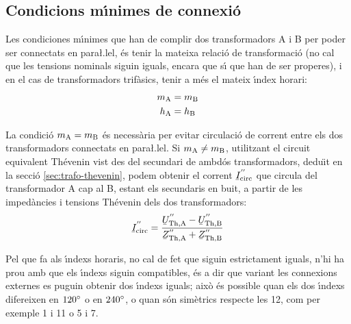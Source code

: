 \subsection{Condicions m\'{\i}nimes de connexi\'{o}}

Les condiciones m\'{\i}nimes que han de complir dos transformadors A i B per poder ser connectats en para{\l.l}el, \'{e}s tenir la mateixa relaci\'{o} de transformaci\'{o} (no cal que les tensions nominals siguin iguals, encara que s\'{\i} que han de ser properes), i en el cas de transformadors trif\`{a}sics, tenir a m\'{e}s el mateix \'{\i}ndex horari:
\begin{align}
    m_\mathrm{A} &= m_\mathrm{B}\\
    h_\mathrm{A} &= h_\mathrm{B}
\end{align}

La condici\'{o} $m_\mathrm{A} = m_\mathrm{B}$ \'{e}s necess\`{a}ria per evitar circulaci\'{o} de corrent entre els dos transformadors connectats en para{\l.l}el. Si $m_\mathrm{A} \neq m_\mathrm{B}$, utilitzant el circuit equivalent  Th\'{e}venin vist des del secundari de ambd\'{o}s transformadors, dedu\"{\i}t en la secci\'{o} \vref{sec:trafo-thevenin}, podem obtenir el corrent $\cmplx{I}\ped{circ}^{''}$ que circula del transformador A cap al B, estant els secundaris en buit, a partir de les imped\`{a}ncies i tensions Th\'{e}venin dels dos transformadors:
\begin{equation}
    \cmplx{I}\ped{circ}^{''} = \frac{\cmplx{U}\ped{Th,A}^{''}-\cmplx{U}\ped{Th,B}^{''}}{\cmplx{Z}\ped{Th,A}^{''}+\cmplx{Z}\ped{Th,B}^{''}}
\end{equation}

Pel que fa als \'{\i}ndexs horaris, no cal de fet que siguin estrictament iguals, n'hi ha prou amb que els \'{\i}ndexs siguin compatibles, \'{e}s a dir que variant les connexions externes es puguin obtenir dos \'{\i}ndexs iguals; aix\`{o} \'{e}s possible quan els dos \'{\i}ndexs difereixen en $120^\circ$ o en $240^\circ$, o quan s\'{o}n sim\`{e}trics respecte les 12, com per exemple 1 i 11 o 5 i 7.


